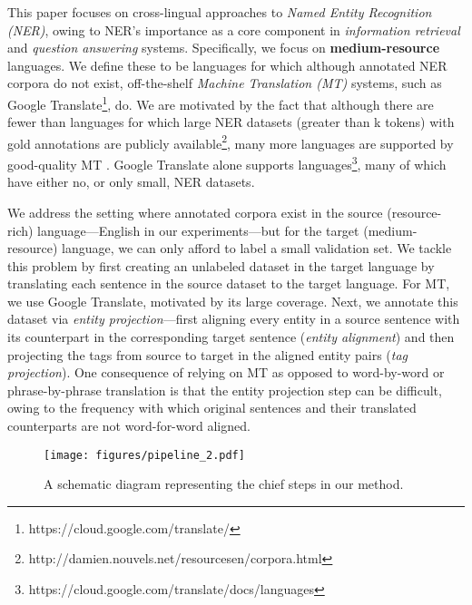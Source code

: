 \documentclass[11pt,a4paper]{article}
\begin{document}
This paper focuses on cross-lingual approaches 
to \emph{Named Entity Recognition (NER)},
owing to 
NER's importance as a core component
in \emph{information retrieval} and \emph{question answering} systems. 
Specifically, we focus on \textbf{medium-resource} languages.
We define these to be languages 
for which although annotated NER corpora do not exist, 
off-the-shelf \emph{Machine Translation (MT)} systems, 
such as Google Translate\footnote{https://cloud.google.com/translate/}, do. 
We are motivated by the fact that although there are fewer than  languages for which large NER datasets (greater than k tokens) 
with gold annotations are publicly available\footnote{http://damien.nouvels.net/resourcesen/corpora.html}, 
many more languages are supported by good-quality MT  \citep{wu2016google}.
Google Translate alone supports  languages\footnote{https://cloud.google.com/translate/docs/languages}, 
many of which have either no, or only small, NER datasets. 












We address the setting where
annotated corpora exist in the source 
(resource-rich) language---English in our experiments---but for the target (medium-resource) language, 
we can only afford to label a small validation set. 
We tackle this problem by first creating 
an unlabeled dataset in the target language 
by translating each sentence in the source dataset to the target language. 
For MT, we use Google Translate,
motivated by its large coverage. 
Next, we annotate this dataset 
via
\emph{entity projection}---first aligning every entity in a source sentence 
with its counterpart in the corresponding target sentence 
(\textit{entity alignment}) 
and then projecting the tags from source to target 
in the aligned entity pairs (\textit{tag projection}). 
One consequence of 
relying on MT
as opposed to word-by-word or phrase-by-phrase translation
is that the entity projection step can be difficult, 
owing to the frequency with which original sentences
and their translated counterparts are not word-for-word aligned.


\begin{figure*}[ht!]
    \centering
    \texttt{[image: figures/pipeline\_2.pdf]}
    \caption{A schematic diagram representing the chief steps in our method.}
\label{fig:pipeline}
\end{figure*}
\end{document}
